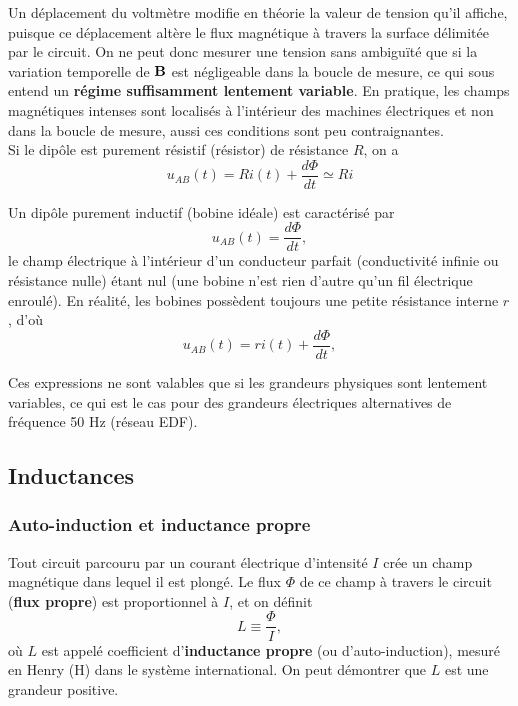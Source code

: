 \documentclass[11pt,a4paper]{report}
\begin{document}
Un déplacement du voltmètre modifie en théorie la valeur de tension qu'il affiche, puisque ce déplacement altère le flux magnétique à travers la surface délimitée par le circuit. On ne peut donc mesurer une tension sans ambiguïté que si la variation temporelle de $\bold{B}$ est négligeable dans la boucle de mesure, ce qui sous entend un \textbf{régime suffisamment lentement variable}. En pratique, les champs magnétiques intenses sont localisés à l'intérieur des machines électriques et non dans la boucle de mesure, aussi ces conditions sont peu contraignantes.\\

Si le dipôle est purement résistif (résistor) de résistance $R$, on a
\begin{equation}
	u_{AB}(t) = Ri(t) + \frac{d\Phi}{dt} \simeq Ri
\end{equation}

Un dipôle purement inductif (bobine idéale) est caractérisé par
\begin{equation}
	u_{AB}(t) = \frac{d\Phi}{dt},
\end{equation}
le champ électrique à l'intérieur d'un conducteur parfait (conductivité infinie ou résistance nulle) étant nul (une bobine n'est rien d'autre qu'un fil électrique enroulé). En réalité, les bobines possèdent toujours une petite résistance interne $r$, d'où
\begin{equation}
	u_{AB}(t) = ri(t) + \frac{d\Phi}{dt},
\end{equation}

Ces expressions ne sont valables que si les grandeurs physiques sont lentement variables, ce qui est le cas pour des grandeurs électriques alternatives de fréquence 50 Hz (réseau EDF).

\subsection{Inductances}

\subsubsection{Auto-induction et inductance propre}

Tout circuit parcouru par un courant électrique d'intensité $I$ crée un champ magnétique dans lequel il est plongé. Le flux $\Phi$ de ce champ à travers le circuit (\textbf{flux propre}) est proportionnel à $I$, et on définit 
\begin{equation}
	L \equiv \frac{\Phi}{I},
\end{equation}
où $L$ est appelé coefficient d'\textbf{inductance propre} (ou d'auto-induction), mesuré en Henry (H) dans le système international. On peut démontrer que $L$ est une grandeur positive.\\
\end{document}

